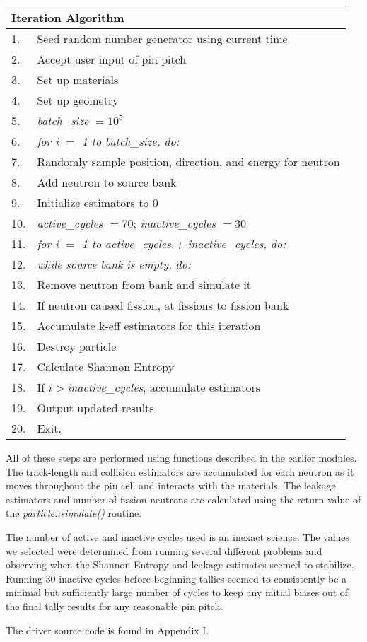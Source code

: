 \begin{center}
\begin{tabular}{l|l}
\multicolumn{2}{l}{Iteration Algorithm} \\ \hline\hline
1.  & Seed random number generator using current time \\
2.  & Accept user input of pin pitch \\
3.  & Set up materials \\
4.  & Set up geometry \\
5.  & \textit{batch{\_}size} $=10^5$ \\
6.  & \textit{for i $=$ 1 to batch{\_}size, do:} \\
7.  & \quad Randomly sample position, direction, and energy for neutron \\
8.  & \quad Add neutron to source bank \\
9.  & Initialize estimators to 0 \\
10. & \textit{active{\_}cycles $=70$}; \textit{inactive{\_}cycles $=30$} \\
11. & \textit{for i $=$ 1 to active{\_}cycles + inactive{\_}cycles, do:} \\
12. & \quad \textit{while source bank is empty, do:} \\
13. & \quad\quad Remove neutron from bank and simulate it \\
14. & \quad\quad If neutron caused fission, at fissions to fission bank \\
15. & \quad\quad Accumulate k-eff estimators for this iteration \\
16. & \quad\quad Destroy particle \\
17. & \quad Calculate Shannon Entropy \\
18. & \quad If $i > $\textit{inactive{\_}cycles}, accumulate estimators \\
19. & \quad Output updated results \\
20. & Exit.
\end{tabular}
\end{center}

All of these steps are performed using functions described in the earlier modules.  The track-length and collision estimators are accumulated for each neutron as it moves throughout the pin cell and interacts with the materials.  The leakage estimators and number of fission neutrons are calculated using the return value of the \textit{particle::simulate()} routine.

The number of active and inactive cycles used is an inexact science.  The values we selected were determined from running several different problems and observing when the Shannon Entropy and leakage estimates seemed to stabilize.  Running 30 inactive cycles before beginning tallies seemed to consistently be a minimal but sufficiently large number of cycles to keep any initial biases out of the final tally results for any reasonable pin pitch.

The driver source code is found in Appendix I.

